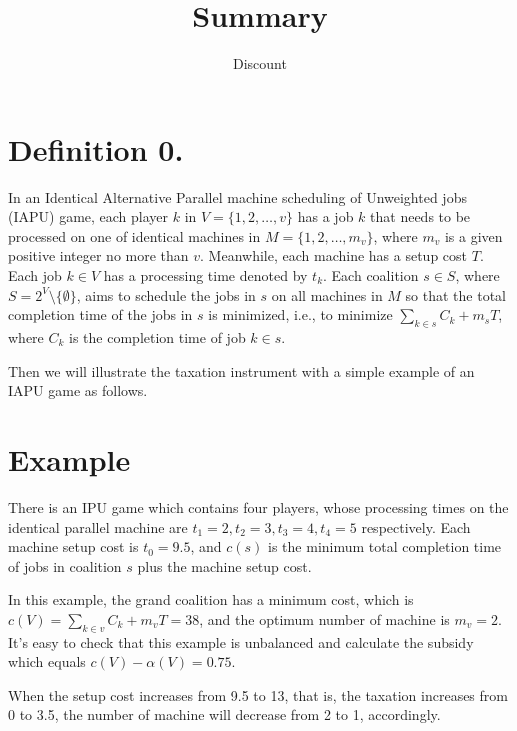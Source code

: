 \documentclass[UTF8]{article}
\title{Summary}
\author{Dis\cdot count}
\begin{document}
\maketitle{}





%



\section*{Definition 0.}
In an Identical Alternative Parallel machine scheduling of Unweighted jobs (IAPU) game, each player $k$ in $V=\{1,2,\ldots,v\}$ has a job $k$ that needs to be processed on one of identical machines in $M=\{1,2,\ldots,m_v\}$, where $m_v$ is a given positive integer no more than $v$. Meanwhile, each machine has a setup cost $T$. Each job $k\in V$ has a processing time denoted by $t_k$. Each coalition $s \in S$, where $S=2^V\setminus\{\emptyset\}$, aims to schedule the jobs in $s$ on all machines in $M$ so that the total completion  time of the jobs in $s$ is minimized, i.e., to minimize $\sum_{k\in s}{C_k}+m_sT $,
where $C_k$ is the completion time of job $k\in s$.


Then we will illustrate the taxation instrument with a simple example of an IAPU game as follows.

\section*{Example}

There is an IPU game which contains four players, whose processing times on the identical parallel machine are $t_1=2, t_2=3, t_3=4, t_4=5$ respectively. Each machine setup cost is $t_0=9.5$, and $c(s)$ is the minimum total completion time of jobs in coalition $s$ plus the machine setup cost.

In this example, the grand coalition has a minimum cost, which is $c(V) = \sum_{k\in v}{C_k}+m_vT = 38$, and the optimum number of machine is $m_v = 2$.
It's easy to check that this example is unbalanced and calculate the subsidy which equals $c(V) - \alpha(V) = 0.75$.

When the setup cost increases from 9.5 to 13, that is, the taxation increases from 0 to 3.5,
the number of machine will decrease from 2 to 1, accordingly.
\end{document}
